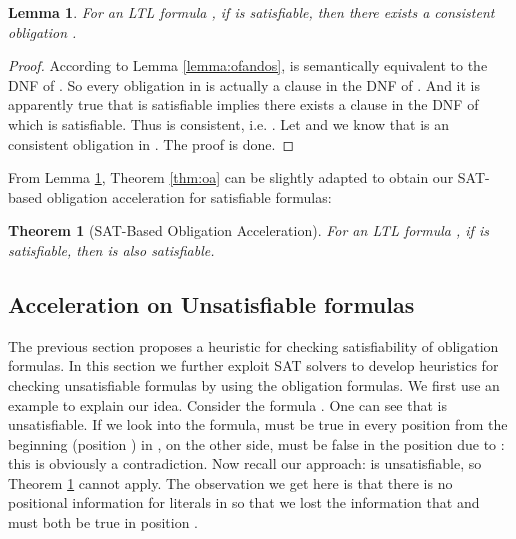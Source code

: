 \documentclass[conference]{IEEEtran}
\newtheorem{lemma}{Lemma}
\newtheorem{theorem}{Theorem}
\newtheorem{proof}{IEEEproof}
\begin{document}
\begin{lemma}\label{lem:reduction}
  For an LTL formula , if  is satisfiable, then there exists a consistent 
  obligation . 
\end{lemma}
\begin{proof}
  According to Lemma \ref{lemma:ofandos},  is semantically
  equivalent to the DNF of . So every
  obligation in  is actually a clause in the DNF of
  . And it is apparently true that  is
  satisfiable implies there exists a clause  in the DNF of
   which is satisfiable. Thus  is consistent,
  i.e. . Let  and we know that  is an
  consistent obligation in . The proof is done.
  
\end{proof}

From Lemma \ref{lem:reduction}, Theorem \ref{thm:oa} can be slightly adapted to obtain 
our SAT-based obligation acceleration for satisfiable formulas:

\begin{theorem}[SAT-Based Obligation Acceleration]\label{thm:satoa}
  For an LTL formula , if  is satisfiable, then  is also satisfiable. 
\end{theorem}
\iffalse
\begin{proof}
First from Lemma \ref{lem:reduction} we know  is satisfiable implies there exists a 
consistent obligation  in . Then according to Theorem \ref{thm:oa} we can conclude 
that  is satisfiable. 
\end{proof}
\fi


\subsection{Acceleration on Unsatisfiable formulas}
The previous section proposes a heuristic for checking satisfiability
of obligation formulas. In this section we further
exploit SAT solvers to develop heuristics for checking unsatisfiable
formulas by using the obligation formulas. We first use an example to
explain our idea. Consider the formula .  One
can see that  is unsatisfiable. If we look into the formula, 
must be true in every position from the beginning (position ) in
, on the other side,  must be false in the position  due to
: this is obviously a contradiction.  Now recall our approach:  is unsatisfiable, so Theorem \ref{thm:satoa} cannot
apply. The observation we get here is that there is no
positional information for literals in  so that we lost the
information that  and  must both be true in position .
\end{document}
